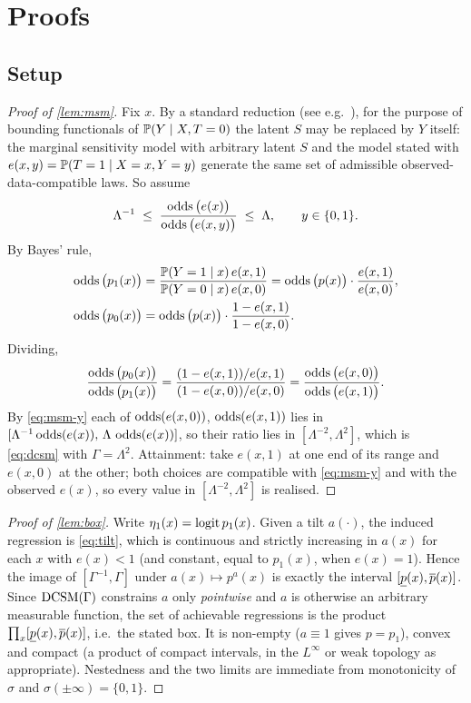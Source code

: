 \section{Proofs}
\label{app:proofs}

\subsection{Setup}
\label{app:setup}

\begin{proof}[Proof of \cref{lem:msm}]
Fix $x$. By a standard reduction (see e.g.\ \citealp{dorn2023sharp}), for the
purpose of bounding functionals of $\mathbb{P}(Y\mid X, T=0)$ the latent $S$ may be
replaced by $Y$ itself: the marginal sensitivity model with arbitrary latent $S$
and the model stated with $e(x,y)=\mathbb{P}(T=1\mid X=x, Y=y)$ generate the same set
of admissible observed-data-compatible laws. So assume
\begin{equation}
  \Lambda^{-1}
  \;\le\;
  \frac{\operatorname{odds}\big(e(x)\big)}{\operatorname{odds}\big(e(x,y)\big)}
  \;\le\;\Lambda,
  \qquad y\in\{0,1\}.
  \label{eq:msm-y}
\end{equation}
By Bayes' rule,
\[
\begin{aligned}
  \operatorname{odds}\big(p_1(x)\big)
  &= \frac{\mathbb{P}(Y=1\mid x)\,e(x,1)}{\mathbb{P}(Y=0\mid x)\,e(x,0)}
  = \operatorname{odds}\big(p(x)\big)\cdot\frac{e(x,1)}{e(x,0)},\\
  \operatorname{odds}\big(p_0(x)\big)
  &= \operatorname{odds}\big(p(x)\big)\cdot\frac{1-e(x,1)}{1-e(x,0)} .
\end{aligned}
\]
Dividing,
\[
  \frac{\operatorname{odds}\big(p_0(x)\big)}{\operatorname{odds}\big(p_1(x)\big)}
  = \frac{(1-e(x,1))/e(x,1)}{(1-e(x,0))/e(x,0)}
  = \frac{\operatorname{odds}\big(e(x,0)\big)}{\operatorname{odds}\big(e(x,1)\big)} .
\]
By \eqref{eq:msm-y} each of $\operatorname{odds}(e(x,0))$, $\operatorname{odds}(e(x,1))$ lies in
$[\Lambda^{-1}\operatorname{odds}(e(x)),\,\Lambda\,\operatorname{odds}(e(x))]$, so their ratio lies in
$[\Lambda^{-2},\Lambda^{2}]$, which is \eqref{eq:dcsm} with $\Gamma=\Lambda^2$.
Attainment: take $e(x,1)$ at one end of its range and $e(x,0)$ at the other; both
choices are compatible with \eqref{eq:msm-y} and with the observed $e(x)$, so
every value in $[\Lambda^{-2},\Lambda^2]$ is realised.
\end{proof}

\begin{proof}[Proof of \cref{lem:box}]
Write $\eta_1(x)=\operatorname{logit} p_1(x)$. Given a tilt $a(\cdot)$, the induced regression
is \eqref{eq:tilt}, which is continuous and strictly increasing in $a(x)$ for
each $x$ with $e(x)<1$ (and constant, equal to $p_1(x)$, when $e(x)=1$). Hence
the image of $[\Gamma^{-1},\Gamma]$ under $a(x)\mapsto p^{a}(x)$ is exactly the
interval $[\underline{p}(x),\overline{p}(x)]$. Since $\textup{DCSM}(\Gamma)$ constrains $a$ only
\emph{pointwise} and $a$ is otherwise an arbitrary measurable function, the set of
achievable regressions is the product $\prod_x[\underline{p}(x),\overline{p}(x)]$, i.e.\ the
stated box. It is non-empty ($a\equiv1$ gives $p=p_1$), convex and compact
(a product of compact intervals, in the $L^\infty$ or weak topology as
appropriate). Nestedness and the two limits are immediate from monotonicity of
$\sigma$ and $\sigma(\pm\infty)=\{0,1\}$.
\end{proof}

